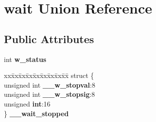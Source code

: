 \hypertarget{unionwait}{\section{wait Union Reference}
\label{unionwait}
}
\subsection*{Public Attributes}
\begin{DoxyCompactItemize}
\item 
\hypertarget{unionwait_acf7db74d249efc70e36c999def67f51d}{int {\bfseries w\+\_\+status}}\label{unionwait_acf7db74d249efc70e36c999def67f51d}

\item 
\hypertarget{unionwait_aea5e833b92c12e342def48e7cc1d7d6d}{\begin{tabbing}
xx\=xx\=xx\=xx\=xx\=xx\=xx\=xx\=xx\=\kill
struct \{\\
\hypertarget{structwait_1_1@19_adb79bba51ee20c941a107eb29fbde274}{\>unsigned int {\bfseries \_\_w\_termsig}:7\\
\hypertarget{structwait_1_1@19_a912a70a1302d16f2413bae36c2ee8d02}{\>unsigned int {\bfseries \_\_w\_coredump}:1\\
\hypertarget{structwait_1_1@19_a555a539ae13c86cef4b10fbca34ce7db}{\>unsigned int {\bfseries \_\_w\_retcode}:8\\
\hypertarget{structwait_1_1@19_abf50f10c736e4c01e439591e7fa8b531}{\>unsigned {\bfseries int}:16\\
\} {\bfseries \_\_wait\_terminated}}\label{unionwait_aea5e833b92c12e342def48e7cc1d7d6d}
\\

\end{tabbing}\item 
\hypertarget{unionwait_ae106b4fd6e93b60406c1065a37c70524}{\begin{tabbing}
xx\=xx\=xx\=xx\=xx\=xx\=xx\=xx\=xx\=\kill
struct \{\\
\hypertarget{structwait_1_1@20_a8b92e53b6a640051ce71957434cc5622}{\>unsigned int {\bfseries \_\_w\_stopval}:8\\
\hypertarget{structwait_1_1@20_a3700e8e83e5ff1eb54220710e34163e9}{\>unsigned int {\bfseries \_\_w\_stopsig}:8\\
\hypertarget{structwait_1_1@20_abf50f10c736e4c01e439591e7fa8b531}{\>unsigned {\bfseries int}:16\\
\} {\bfseries \_\_wait\_stopped}}\label{unionwait_ae106b4fd6e93b60406c1065a37c70524}
\\

}}
\end{tabbing}}}
\end{DoxyCompactItemize}
